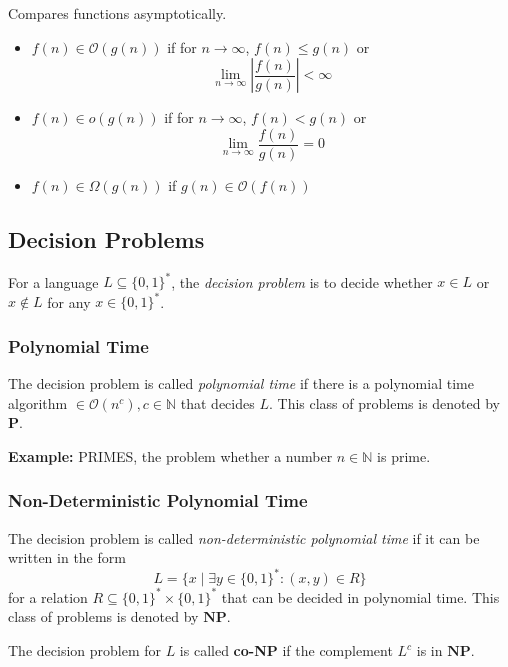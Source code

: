 \documentclass[a4paper]{scrartcl}
\newcommand\N{\mathbb N}
\newcommand\bigO{\mathcal O}
\newcommand\bigo o
\newcommand\compP{\mathbf{P}}
\newcommand\compNP{\mathbf{NP}}
\begin{document}
Compares functions asymptotically.

\begin{itemize}
    \item $f(n)\in\bigO(g(n))$ if for $n\rightarrow\infty$, $f(n) \leq g(n)$ or
        \[\lim_{n\rightarrow\infty}\left|\frac{f(n)}{g(n)}\right| < \infty\]
    \item $f(n)\in\bigo(g(n))$ if for $n\rightarrow\infty$, $f(n) < g(n)$ or
        \[\lim_{n\rightarrow\infty}\frac{f(n)}{g(n)} = 0\]
    \item $f(n)\in\Omega(g(n))$ if $g(n)\in\bigO(f(n))$
\end{itemize}

\subsection{Decision Problems}

For a language $L\subseteq\{0,1\}^*$, the \textit{decision problem} is to decide
whether $x\in L$ or $x\not\in L$ for any $x\in\{0,1\}^*$.

\subsubsection{Polynomial Time}

The decision problem is called \textit{polynomial time} if there is a polynomial
time algorithm $\in\bigO(n^c), c\in\N$ that decides $L$. This class of problems
is denoted by $\compP$.

\textbf{Example:} PRIMES, the problem whether a number $n\in\N$ is prime.

\subsubsection{Non-Deterministic Polynomial Time}

The decision problem is called \textit{non-deterministic polynomial time} if it
can be written in the form 
\[L=\{x\mid\exists y\in\{0,1\}^*:(x,y)\in R\}\]
for a relation $R\subseteq \{0,1\}^* \times \{0,1\}^*$ that can be decided
in polynomial time. This class of problems is denoted by $\compNP$.

\smallskip
The decision problem for $L$ is called \textbf{co-NP} if the complement $L^c$ is in
$\compNP$.
\end{document}
